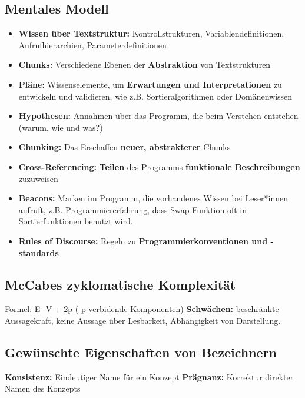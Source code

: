 \documentclass{book}
\begin{document}
    \subsection{Mentales Modell}
    \begin{itemize}
        \item \textbf{Wissen über Textstruktur: }Kontrollstrukturen, Variablendefinitionen, Aufrufhierarchien, Parameterdefinitionen
        \item \textbf{Chunks:} Verschiedene Ebenen der \textbf{Abstraktion} von Textstrukturen
        \item \textbf{Pläne:} Wissenselemente, um \textbf{Erwartungen und Interpretationen} zu entwickeln und validieren, wie z.B.
        Sortieralgorithmen oder Domänenwissen
        \item \textbf{Hypothesen:} Annahmen über das Programm, die beim Verstehen entstehen (warum, wie und was?)
        \item \textbf{Chunking: } Das Erschaffen \textbf{neuer, abstrakterer} Chunks
        \item \textbf{Cross-Referencing:} \textbf{Teilen} des Programms \textbf{funktionale Beschreibungen }zuzuweisen
        \item \textbf{Beacons: } Marken im Programm, die vorhandenes Wissen bei Leser*innen aufruft, z.B. Programmiererfahrung,
        dass Swap-Funktion oft in Sortierfunktionen benutzt wird.
        \item \textbf{Rules of Discourse:} Regeln zu \textbf{Programmierkonventionen und -standards}
    \end{itemize}
    \subsection{\textbf{McCabes zyklomatische Komplexität}}
    Formel: E -V + 2p ( p verbidende Komponenten)
    \textbf{Schwächen: } beschränkte Aussagekraft, keine Aussage über Lesbarkeit, Abhängigkeit von Darstellung.
    \subsection{Gewünschte Eigenschaften von Bezeichnern}
    \textbf{Konsistenz: } Eindeutiger Name für ein Konzept \newline
    \textbf{Prägnanz: } Korrektur direkter Namen des Konzepts
\end{document}
